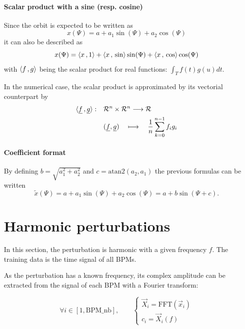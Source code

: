 \paragraph{Scalar product with a sine (resp. cosine)}
Since the orbit is expected to be written as
\begin{equation*}
x(\Psi) = a+ a_1 \sin(\Psi) + a_2 \cos(\Psi)
\end{equation*}
it can also be described as
\begin{equation}
x(\Psi) = \langle x {\,,\,} 1 \rangle + \langle x {\,,\,} \sin \rangle \sin(\Psi) + \langle x {\,,\,} \cos \rangle \cos(\Psi)
\end{equation}
with $\langle f {\,,\,} g \rangle$ being the scalar product for real functions: $\int_T f(t)g(u)dt$.

In the numerical case, the scalar product is approximated by its vectorial counterpart by
\begin{align*}
\langle \underline{f} {\,,\,} \underline{g} \rangle: \quad
 &\mathcal{R}^n \times \mathcal{R}^n \longrightarrow \mathcal{R} \\
 & (\underline{f},\underline{g}) \quad\longmapsto \quad \frac{1}{n}\sum\limits_{k=0}^{n-1} f_i g_i
\end{align*}

\paragraph{Coefficient format}
By defining $b = \sqrt{a_1^2+a_2^2}$ and $c = \mathrm{atan2}(a_2, a_1)$ the previous formulas can be written
\begin{equation*}
\tilde{x}(\Psi) = a + a_1 \sin(\Psi) + a_2 \cos(\Psi) = a + b \sin(\Psi + c).
\end{equation*} 

\section{Harmonic perturbations}
In this section, the perturbation is harmonic with a given frequency $f$. The training data is the time signal of all BPMs.

As the perturbation has a known frequency, its complex amplitude can be extracted from the signal of each BPM with a Fourier transform:

\begin{equation}
\forall i \in [1, \mathrm{BPM\_nb}], \qquad 
\begin{cases}
\vec{X}_i = \mathrm{FFT}(\vec{x}_i) \\
c_i = \vec{X}_i(f)
\end{cases}
\end{equation}


